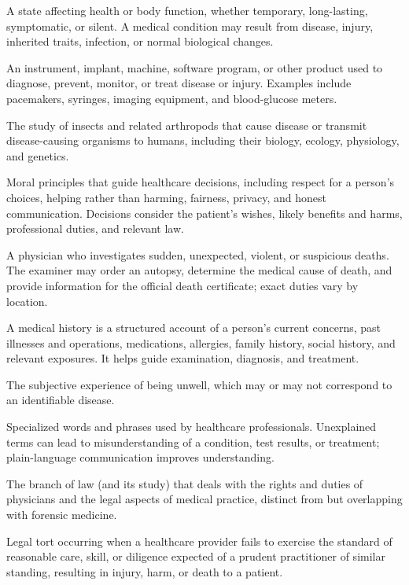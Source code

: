  A state affecting health or body function, whether temporary, long-lasting, symptomatic, or silent. A medical condition may result from disease, injury, inherited traits, infection, or normal biological changes.

 An instrument, implant, machine, software program, or other product used to diagnose, prevent, monitor, or treat disease or injury. Examples include pacemakers, syringes, imaging equipment, and blood-glucose meters.

 The study of insects and related arthropods that cause disease or transmit disease-causing organisms to humans, including their biology, ecology, physiology, and genetics.

 Moral principles that guide healthcare decisions, including respect for a person's choices, helping rather than harming, fairness, privacy, and honest communication. Decisions consider the patient's wishes, likely benefits and harms, professional duties, and relevant law.

 A physician who investigates sudden, unexpected, violent, or suspicious deaths. The examiner may order an autopsy, determine the medical cause of death, and provide information for the official death certificate; exact duties vary by location.

 A medical history is a structured account of a person’s current concerns, past illnesses and operations, medications, allergies, family history, social history, and relevant exposures. It helps guide examination, diagnosis, and treatment.

 The subjective experience of being unwell, which may or may not correspond to an
identifiable disease.

 Specialized words and phrases used by healthcare professionals. Unexplained terms can lead to misunderstanding of a condition, test results, or treatment; plain-language communication improves understanding.

 The branch of law (and its study) that deals with the rights and duties of physicians
and the legal aspects of medical practice, distinct from but overlapping with forensic
medicine.

 Legal tort occurring when a healthcare provider fails to exercise the standard of
reasonable care, skill, or diligence expected of a prudent practitioner of similar
standing, resulting in injury, harm, or death to a patient.

